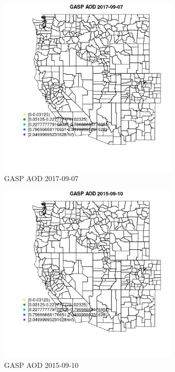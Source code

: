 \begin{figure} 
\centering  
\includegraphics[width=0.77\textwidth]{Code_Outputs/Report_ML_input_PM25_Step4_part_e_de_duplicated_aveswNAs_MapObsGASP_AOD2017-09-07.jpg} 
\caption{\label{fig:Report_ML_input_PM25_Step4_part_e_de_duplicated_aveswNAsMapObsGASP_AOD2017-09-07}GASP AOD 2017-09-07} 
\end{figure} 
 

\begin{figure} 
\centering  
\includegraphics[width=0.77\textwidth]{Code_Outputs/Report_ML_input_PM25_Step4_part_e_de_duplicated_aveswNAs_MapObsGASP_AOD2015-09-10.jpg} 
\caption{\label{fig:Report_ML_input_PM25_Step4_part_e_de_duplicated_aveswNAsMapObsGASP_AOD2015-09-10}GASP AOD 2015-09-10} 
\end{figure} 
 


